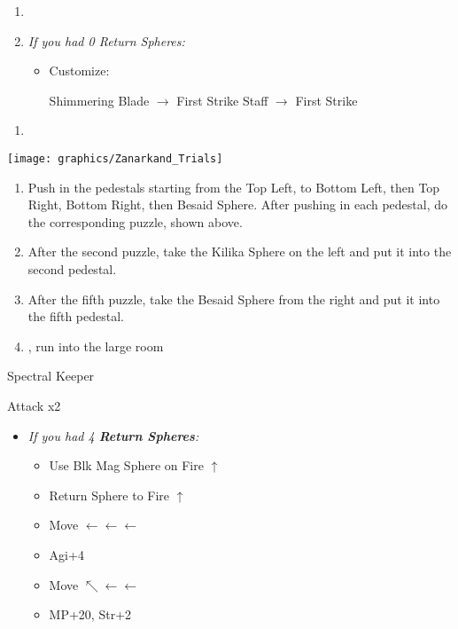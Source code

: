 \begin{enumerate}[resume]
    \item \formation{\tidus}{\auron}{\yuna}
    \bothcb
    \item \textit{If you had 0 Return Spheres:}
    \begin{itemize}
        \item Customize:
        \begin{itemize}
            \auronf Shimmering Blade $\rightarrow$ First Strike
            \yunaf Staff $\rightarrow$ First Strike
        \end{itemize}
    \end{itemize}
\end{enumerate}
\begin{enumerate}[resume]
    \item {\large \save}
\end{enumerate}
\texttt{[image: graphics/Zanarkand\_Trials]}
\begin{enumerate}[resume]
    \item Push in the pedestals starting from the Top Left, to Bottom Left, then Top Right, Bottom Right, then Besaid Sphere. After pushing in each pedestal, do the corresponding puzzle, shown above.
    \item After the second puzzle, take the Kilika Sphere on the left and put it into the second pedestal.
    \item After the fifth puzzle, take the Besaid Sphere from the right and put it into the fifth pedestal.
    \item \cs, run into the large room
\end{enumerate}
\begin{battle}[52000]{Spectral Keeper}
    \begin{itemize}
        \summon{\bahamut}
        \bahamutf Attack x2
    \end{itemize}
\end{battle}
\begin{spheregrid}
    \begin{itemize}
        \yunaf
        \begin{itemize}
            \item \textit{If you had 4 \textbf{Return Spheres}:}
            \begin{itemize}
                \item Use Blk Mag Sphere on Fire $\uparrow$
                \item Return Sphere to Fire $\uparrow$
                \item Move $\leftarrow\leftarrow\leftarrow$
                \item Agi+4
                \item Move $\nwarrow\leftarrow\leftarrow$
                \item MP+20, Str+2
            \end{itemize}
        \end{itemize}
    \end{itemize}
\end{spheregrid}
